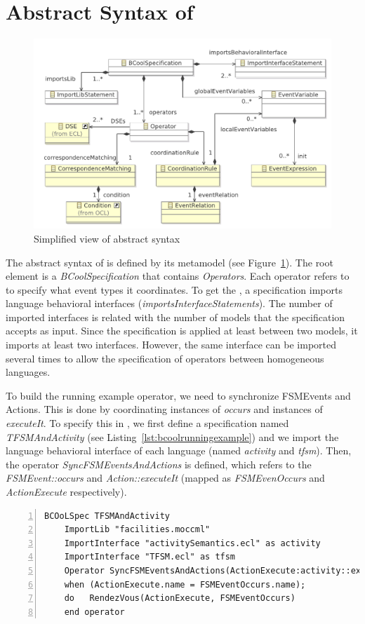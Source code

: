 \section{Abstract Syntax of \bcool}
\begin{figure}
	\center
	\includegraphics[width=.8\textwidth]{bcool/figs/BcoolMM}
	\caption{Simplified view of \bcool abstract syntax}
	\label{fig:bcool}
\end{figure}

The abstract syntax of \bcool is defined by its metamodel (see Figure~\ref{fig:bcool}). The root element is a \emph{BCoolSpecification} that contains \emph{Operators}. Each operator refers to \dse to specify what event types it coordinates. To get the \dse, a \bcool specification imports language behavioral interfaces (\emph{importsInterfaceStatements}). The number of imported interfaces is related with the number of models that the specification accepts as input. Since the \bcool specification is applied at least between two models, it imports at least two interfaces. However, the same interface can be imported several times to allow the specification of operators between homogeneous languages.   

To build the running example operator, we need to synchronize FSMEvents and Actions. This is done by coordinating instances of \dse \emph{occurs} and instances of \dse \emph{executeIt}. To specify this in \bcool, we first define a specification named \emph{TFSMAndActivity} (see Listing~\ref{lst:bcoolrunningexample}) and we import the language behavioral interface of each language (named \emph{activity} and \emph{tfsm}). Then, the operator \emph{SyncFSMEventsAndActions} is defined, which refers to the \dse \emph{FSMEvent::occurs} and \emph{Action::executeIt} (mapped as \emph{FSMEvenOccurs} and \emph{ActionExecute} respectively). 
	
	 
	\begin{lstlisting}[language=bcool,
	caption={\bcool specification of the running example operator between the TFSM and Activity languages},
	label={lst:bcoolrunningexample}, 
	basicstyle=\scriptsize\ttfamily, backgroundcolor=\color{LGrey}, numbers=left, xleftmargin=2pt]
	BCOoLSpec TFSMAndActivity
	ImportLib "facilities.moccml"
	ImportInterface "activitySemantics.ecl" as activity
	ImportInterface "TFSM.ecl" as tfsm
	Operator SyncFSMEventsAndActions(ActionExecute:activity::executeIt, FSMEventOccurs:tfsm::occurs)
	when (ActionExecute.name = FSMEventOccurs.name);
	do   RendezVous(ActionExecute, FSMEventOccurs)
	end operator
	\end{lstlisting}
	
